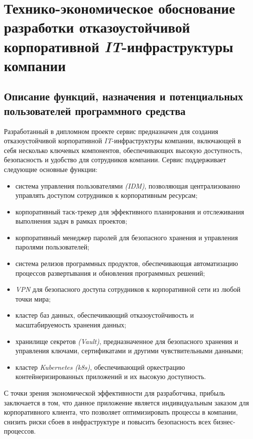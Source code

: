 \setcounter{section}{6}
\section{Технико-экономическое обоснование разработки отказоустойчивой корпоративной \textit{IT}-инфраструктуры компании}

\subsection{Описание функций, назначения и потенциальных пользователей программного средства}

Разработанный в дипломном проекте сервис предназначен для создания отказоустойчивой корпоративной \textit{IT}-инфраструктуры компании, включающей в себя несколько ключевых компонентов, обеспечивающих высокую доступность, безопасность и удобство для сотрудников компании. Сервис поддерживает следующие основные функции:

\begin{itemize}
    \item система управления пользователями \textit{(IDM)}, позволяющая централизованно управлять доступом сотрудников к корпоративным ресурсам;
    \item корпоративный таск-трекер для эффективного планирования и отслеживания выполнения задач в рамках проектов;
    \item корпоративный менеджер паролей для безопасного хранения и управления паролями пользователей;
    \item система релизов программных продуктов, обеспечивающая автоматизацию процессов развертывания и обновления программных решений;
    \item \textit{VPN} для безопасного доступа сотрудников к корпоративной сети из любой точки мира;
    \item кластер баз данных, обеспечивающий отказоустойчивость и масштабируемость хранения данных;
    \item хранилище секретов \textit{(Vault)}, предназначенное для безопасного хранения и управления ключами, сертификатами и другими чувствительными данными;
    \item кластер \textit{Kubernetes (k8s)}, обеспечивающий оркестрацию контейнеризированных приложений и их высокую доступность.
\end{itemize}

С точки зрения экономической эффективности для разработчика, прибыль заключается в том, что данное приложение является индивидуальным заказом для корпоративного клиента, что позволяет оптимизировать процессы в компании, снизить риски сбоев в инфраструктуре и повысить безопасность всех бизнес-процессов.

